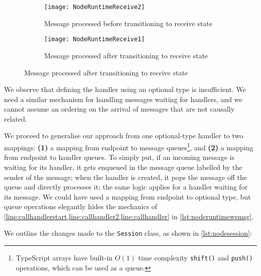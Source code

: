 \begin{figure}[!h]
\centering
\begin{subfigure}[b]{0.8\textwidth}
\centering
\texttt{[image: NodeRuntimeReceive2]}
\caption{Message processed before transitioning to receive state}
\label{subfig:nodereceivemsgfirst}
\end{subfigure}
\hfill
\begin{subfigure}[b]{0.8\textwidth}
\centering
\texttt{[image: NodeRuntimeReceive1]}
\caption{Message processed after transitioning to receive state}
\label{subfig:nodereceivehandlefirst}
\end{subfigure}
\label{fig:nodereceivecompare}
\end{figure}

We observe that defining the handler using an optional type
is insufficient. We need a similar mechanism for handling messages
waiting for handlers, and we cannot assume an ordering on the arrival
of messages that are not causally related.

We proceed to generalise our approach from one optional-type
handler to two mappings:
\textbf{(1)} a mapping from endpoint to message queues\footnote{
TypeScript arrays have built-in $O(1)$ time complexity
\texttt{shift()} and \texttt{push()} operations, which
can be used as a queue.}, and
\textbf{(2)} a mapping from endpoint to handler queues.
To simply put, if an incoming message is waiting for its handler,
it gets enqueued in the message queue labelled by the sender of the message;
when the handler is created, it pops the message off the queue 
and directly processes it; the same logic applies for a handler waiting
for its message.
We could have used a mapping from endpoint to optional type,
but queue operations elegantly hides the mechanics of
\cref{line:callhandlerstart,line:callhandler2,line:callhandler}
in \cref{lst:noderuntimewsmsg}.

We outline the changes made to the \texttt{Session} class,
as shown in \cref{lst:nodesession}:

